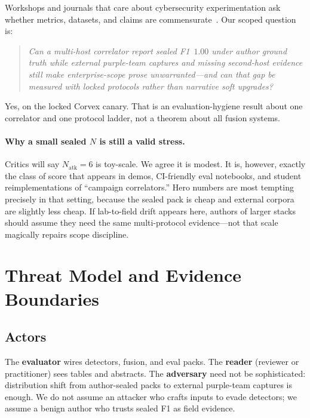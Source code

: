 \documentclass[conference,compsoc]{IEEEtran}
\begin{document}
Workshops and journals that care about cybersecurity experimentation ask whether
metrics, datasets, and claims are commensurate~\cite{cset_charter,ring_2019_survey}.
Our scoped question is:
\begin{quote}
\emph{Can a multi-host correlator report sealed F1~$1.00$ under author ground
truth while external purple-team captures and missing second-host evidence
still make enterprise-scope prose unwarranted---and can that gap be measured
with locked protocols rather than narrative soft upgrades?}
\end{quote}
Yes, on the locked Corvex canary.
That is an evaluation-hygiene result about one correlator and one protocol
ladder, not a theorem about all fusion systems.

\paragraph{Why a small sealed $N$ is still a valid stress.}
Critics will say $N_{\mathrm{atk}}{=}6$ is toy-scale.
We agree it is modest.
It is, however, exactly the class of score that appears in demos, CI-friendly
eval notebooks, and student reimplementations of ``campaign correlators.''
Hero numbers are most tempting precisely in that setting, because the sealed
pack is cheap and external corpora are slightly less cheap.
If lab-to-field drift appears here, authors of larger stacks should assume they
need the same multi-protocol evidence---not that scale magically repairs scope
discipline.

\section{Threat Model and Evidence Boundaries}
\label{sec:threat}

\subsection{Actors}
The \textbf{evaluator} wires detectors, fusion, and eval packs.
The \textbf{reader} (reviewer or practitioner) sees tables and abstracts.
The \textbf{adversary} need not be sophisticated: distribution shift from
author-sealed packs to external purple-team captures is enough.
We do not assume an attacker who crafts inputs to evade detectors; we assume a
benign author who trusts sealed F1 as field evidence.
\end{document}
